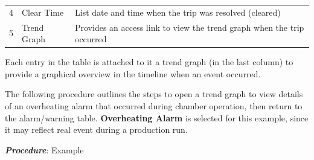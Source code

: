 \begin{longtable}[]{@{}lll@{}}
\begin{minipage}[t]{0.04\columnwidth}
4\strut
\end{minipage} & \begin{minipage}[t]{0.23\columnwidth}\raggedright
Clear Time\strut
\end{minipage} & \begin{minipage}[t]{0.65\columnwidth}\raggedright
List date and time when the trip was resolved (cleared)\strut
\end{minipage}\tabularnewline
\begin{minipage}[t]{0.04\columnwidth}\raggedright
5\strut
\end{minipage} & \begin{minipage}[t]{0.23\columnwidth}\raggedright
Trend Graph\strut
\end{minipage} & \begin{minipage}[t]{0.65\columnwidth}\raggedright
Provides an access link to view the trend graph when the trip
occurred\strut
\end{minipage}\tabularnewline
\bottomrule
\end{longtable}

Each entry in the table is attached to it a trend graph (in the last
column) to provide a graphical overview in the timeline when an event
occurred.

The following procedure outlines the steps to open a trend graph to view
details of an overheating alarm that occurred during chamber operation,
then return to the alarm/warning table. \textbf{Overheating Alarm} is
selected for this example, since it may reflect real event during a
production run.

\textbf{\emph{Procedure}}: Example

